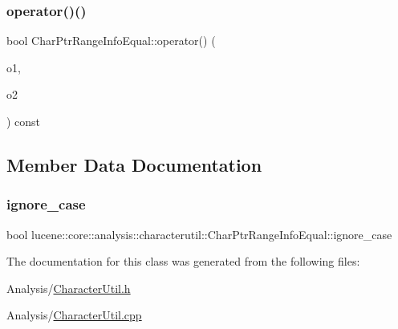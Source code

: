 \subsubsection{\texorpdfstring{operator()()}{operator()()}}
{\footnotesize\ttfamily bool Char\+Ptr\+Range\+Info\+Equal\+::operator() (\begin{DoxyParamCaption}\item[{\mbox{\hyperlink{ZlibCrc32_8h_a2c212835823e3c54a8ab6d95c652660e}{const}} \mbox{\hyperlink{classlucene_1_1core_1_1analysis_1_1characterutil_1_1CharPtrRangeInfo}{Char\+Ptr\+Range\+Info}} \&}]{o1,  }\item[{\mbox{\hyperlink{ZlibCrc32_8h_a2c212835823e3c54a8ab6d95c652660e}{const}} \mbox{\hyperlink{classlucene_1_1core_1_1analysis_1_1characterutil_1_1CharPtrRangeInfo}{Char\+Ptr\+Range\+Info}} \&}]{o2 }\end{DoxyParamCaption}) const}



\subsection{Member Data Documentation}
\mbox{\label{classlucene_1_1core_1_1analysis_1_1characterutil_1_1CharPtrRangeInfoEqual_a35cd49cc9665460db909c8c3ed635c27}} 
\subsubsection{\texorpdfstring{ignore\+\_\+case}{ignore\_case}}
{\footnotesize\ttfamily bool lucene\+::core\+::analysis\+::characterutil\+::\+Char\+Ptr\+Range\+Info\+Equal\+::ignore\+\_\+case\hspace{0.3cm}{\ttfamily [private]}}



The documentation for this class was generated from the following files\+:\begin{DoxyCompactItemize}
\item 
Analysis/\mbox{\hyperlink{CharacterUtil_8h}{Character\+Util.\+h}}\item 
Analysis/\mbox{\hyperlink{CharacterUtil_8cpp}{Character\+Util.\+cpp}}\end{DoxyCompactItemize}
